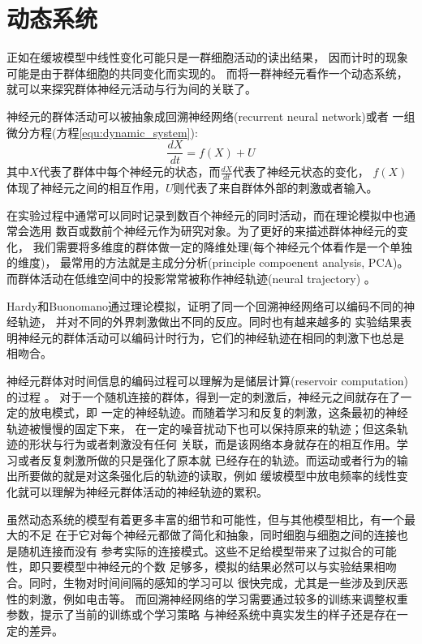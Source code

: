 \section{动态系统}

正如在缓坡模型中线性变化可能只是一群细胞活动的读出结果，
因而计时的现象可能是由于群体细胞的共同变化而实现的。
而将一群神经元看作一个动态系统，就可以来探究群体神经元活动与行为间的关联了。

神经元的群体活动可以被抽象成回溯神经网络(recurrent neural network)或者
一组微分方程(方程\ref{equ:dynamic_system})\cite{remington2018dynamical}:
\begin{equation}
    \label{equ:dynamic_system}
    \frac{dX}{dt} = f(X) + U
\end{equation}
其中$X$代表了群体中每个神经元的状态，而$\frac{dX}{dt}$代表了神经元状态的变化，
$f(X)$体现了神经元之间的相互作用，$U$则代表了来自群体外部的刺激或者输入。

在实验过程中通常可以同时记录到数百个神经元的同时活动，而在理论模拟中也通常会选用
数百或数前个神经元作为研究对象。为了更好的来描述群体神经元的变化，
我们需要将多维度的群体做一定的降维处理(每个神经元个体看作是一个单独的维度)，
最常用的方法就是主成分分析(principle compoenent analysis, PCA)。
而群体活动在低维空间中的投影常常被称作神经轨迹(neural trajectory)
\cite{remington2018dynamical,paton2018neural}。

Hardy和Buonomano通过理论模拟，证明了同一个回溯神经网络可以编码不同的神经轨迹，
并对不同的外界刺激做出不同的反应\cite{hardy2018encoding}。同时也有越来越多的
实验结果表明神经元的群体活动可以编码计时行为，它们的神经轨迹在相同的刺激下也总是
相吻合\cite{paton2018neural,remington2018dynamical,bakhurin2017differential}。

神经元群体对时间信息的编码过程可以理解为是储层计算(reservoir computation)的过程
\cite{hardy2018encoding,paton2018neural,remington2018dynamical,maass2002real}。
对于一个随机连接的群体，得到一定的刺激后，神经元之间就存在了一定的放电模式，即
一定的神经轨迹。而随着学习和反复的刺激，这条最初的神经轨迹被慢慢的固定下来，
在一定的噪音扰动下也可以保持原来的轨迹；但这条轨迹的形状与行为或者刺激没有任何
关联，而是该网络本身就存在的相互作用。学习或者反复刺激所做的只是强化了原本就
已经存在的轨迹。而运动或者行为的输出所要做的就是对这条强化后的轨迹的读取，例如
缓坡模型中放电频率的线性变化就可以理解为神经元群体活动的神经轨迹的累积。




虽然动态系统的模型有着更多丰富的细节和可能性，但与其他模型相比，有一个最大的不足
在于它对每个神经元都做了简化和抽象，同时细胞与细胞之间的连接也是随机连接而没有
参考实际的连接模式。这些不足给模型带来了过拟合的可能性，即只要模型中神经元的个数
足够多，模拟的结果必然可以与实验结果相吻合。同时，生物对时间间隔的感知的学习可以
很快完成，尤其是一些涉及到厌恶性的刺激\cite{simen2011model}，例如电击等。
而回溯神经网络的学习需要通过较多的训练来调整权重参数，提示了当前的训练或个学习策略
与神经系统中真实发生的样子还是存在一定的差异。

